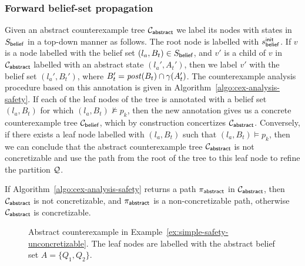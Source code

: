 \subsubsection{Forward belief-set propagation}
Given an abstract counterexample tree $\mathcal{C}_{\mathsf{abstract}}$ we label its nodes with states in $S_{\mathsf{belief}}$ in a top-down manner as follows. 
The root node is labelled with $s_{\mathsf{belief}}^{\mathsf{init}}$. If $v$ is a node labelled with the belief set $(l_a,B_t) \in S_{\mathsf{belief}}$, and  $v'$ is a child of $v$ in $\mathcal{C}_{\mathsf{abstract}}$ labelled with an abstract state $(l_a',A_t')$, then we label $v'$ with the belief set $(l_a',B_t')$, where 
$B_t' = \mathit{post}(B_t) \cap \gamma(A_t')$. The counterexample analysis procedure based on this annotation is given in Algorithm~\ref{algo:cex-analysis-safety}.
If each of the leaf nodes of the tree is annotated with a belief set $(l_a,B_t)$ for which $(l_a,B_t) \not\models p_k$, then the new annotation gives us a concrete counterexample tree $\mathcal{C}_{\mathsf{belief}}$, which by construction concertizes $\mathcal{C}_{\mathsf{abstract}}$. Conversely, if there exists a leaf node labelled with $(l_a,B_t)$ such that $(l_a,B_t) \models p_k$, then we can conclude that the abstract counterexample tree $\mathcal{C}_{\mathsf{abstract}}$ is not concretizable and use the path from the root of the tree to this leaf node to refine the partition $\mathcal{Q}$.

\begin{theorem}
If Algorithm~\ref{algo:cex-analysis-safety} returns a path $\pi_{\mathsf{abstract}}$ in $\mathcal{C}_{\mathsf{abstract}}$, then $\mathcal{C}_{\mathsf{abstract}}$ is not concretizable, and $\pi_{\mathsf{abstract}}$ is a non-concretizable path, otherwise  $\mathcal{C}_{\mathsf{abstract}}$ is concretizable.
\end{theorem}

\begin{figure}
\begin{center}

\end{center}
\caption{Abstract counterexample in Example~\ref{ex:simple-safety-unconcretizable}. The leaf nodes are labelled with the abstract belief set $A = \{Q_1,Q_2\}$.}
\label{fig:simple-safety-counterex-1}
\end{figure}

